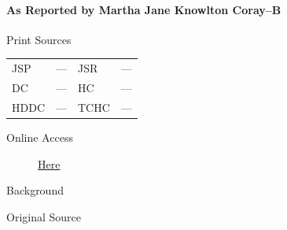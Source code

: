 			\paragraph{As Reported by Martha Jane Knowlton Coray--B}
				\label{EMS-1840-JS-CIR-19-JUL-1840-MC-B}
			
				\begin{description}
					\item[Print Sources]
				\end{description}

				\begin{tabular}{p{0.5in}p{1in}p{0.5in}p{1in}}
					JSP	 	& ---		& JSR 		& --- \\
					DC	 	& ---		& HC 		& --- \\
					HDDC 	& ---		& TCHC 		& --- \\
				\end{tabular}
				
				\begin{description}
					\item[Online Access] \href{https://www.josephsmithpapers.org/paper-summary/discourse-circa-19-july-1840-as-reported-by-martha-jane-knowlton-coray-b/1}{Here}
				\end{description}
				
				\begin{description}
					\item[Background]
				\end{description}
				
				
				\begin{description}
					\item[Original Source]
				\end{description}
				
				
